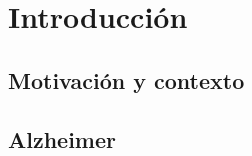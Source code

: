 \chapter{Introducción}\label{ch:introduccion}


\section{Motivación y contexto}\label{sec:motivacion-y-contexto}


\section{Alzheimer}\label{sec:alzheimer}


%
%
%
%
%